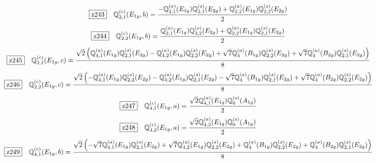\documentclass[fleqn,10pt,landscape]{jsarticle}
\begin{document}
\begin{dmath*}
\hspace*{3mm}\fbox{z243}\quad \mathbb{Q}_{2,1}^{(c)}(E_{1g},b)=\frac{- \mathbb{Q}_{2,1}^{(a)}(E_{1g}) \mathbb{Q}_{2,1}^{(s)}(E_{2g}) + \mathbb{Q}_{2,2}^{(a)}(E_{1g}) \mathbb{Q}_{2,2}^{(s)}(E_{2g})}{2}
\end{dmath*}
\begin{dmath*}
\hspace*{3mm}\fbox{z244}\quad \mathbb{Q}_{2,2}^{(c)}(E_{1g},b)=\frac{\mathbb{Q}_{2,1}^{(a)}(E_{1g}) \mathbb{Q}_{2,2}^{(s)}(E_{2g}) + \mathbb{Q}_{2,2}^{(a)}(E_{1g}) \mathbb{Q}_{2,1}^{(s)}(E_{2g})}{2}
\end{dmath*}
\begin{dmath*}
\hspace*{3mm}\fbox{z245}\quad \mathbb{Q}_{2,1}^{(c)}(E_{1g},c)=\frac{\sqrt{2} \left(\mathbb{Q}_{4,1}^{(a)}(E_{1g}) \mathbb{Q}_{2,1}^{(s)}(E_{2g}) - \mathbb{Q}_{4,2}^{(a)}(E_{1g}) \mathbb{Q}_{2,2}^{(s)}(E_{2g}) + \sqrt{7} \mathbb{Q}_{4}^{(a)}(B_{1g}) \mathbb{Q}_{2,2}^{(s)}(E_{2g}) + \sqrt{7} \mathbb{Q}_{4}^{(a)}(B_{2g}) \mathbb{Q}_{2,1}^{(s)}(E_{2g})\right)}{8}
\end{dmath*}
\begin{dmath*}
\hspace*{3mm}\fbox{z246}\quad \mathbb{Q}_{2,2}^{(c)}(E_{1g},c)=\frac{\sqrt{2} \left(- \mathbb{Q}_{4,1}^{(a)}(E_{1g}) \mathbb{Q}_{2,2}^{(s)}(E_{2g}) - \mathbb{Q}_{4,2}^{(a)}(E_{1g}) \mathbb{Q}_{2,1}^{(s)}(E_{2g}) - \sqrt{7} \mathbb{Q}_{4}^{(a)}(B_{1g}) \mathbb{Q}_{2,1}^{(s)}(E_{2g}) + \sqrt{7} \mathbb{Q}_{4}^{(a)}(B_{2g}) \mathbb{Q}_{2,2}^{(s)}(E_{2g})\right)}{8}
\end{dmath*}
\begin{dmath*}
\hspace*{3mm}\fbox{z247}\quad \mathbb{Q}_{4,1}^{(c)}(E_{1g},a)=\frac{\sqrt{2} \mathbb{Q}_{4,1}^{(a)}(E_{1g}) \mathbb{Q}_{0}^{(s)}(A_{1g})}{2}
\end{dmath*}
\begin{dmath*}
\hspace*{3mm}\fbox{z248}\quad \mathbb{Q}_{4,2}^{(c)}(E_{1g},a)=\frac{\sqrt{2} \mathbb{Q}_{4,2}^{(a)}(E_{1g}) \mathbb{Q}_{0}^{(s)}(A_{1g})}{2}
\end{dmath*}
\begin{dmath*}
\hspace*{3mm}\fbox{z249}\quad \mathbb{Q}_{4,1}^{(c)}(E_{1g},b)=\frac{\sqrt{2} \left(- \sqrt{7} \mathbb{Q}_{4,1}^{(a)}(E_{1g}) \mathbb{Q}_{2,1}^{(s)}(E_{2g}) + \sqrt{7} \mathbb{Q}_{4,2}^{(a)}(E_{1g}) \mathbb{Q}_{2,2}^{(s)}(E_{2g}) + \mathbb{Q}_{4}^{(a)}(B_{1g}) \mathbb{Q}_{2,2}^{(s)}(E_{2g}) + \mathbb{Q}_{4}^{(a)}(B_{2g}) \mathbb{Q}_{2,1}^{(s)}(E_{2g})\right)}{8}
\end{dmath*}
\end{document}
